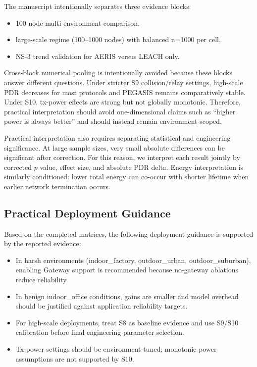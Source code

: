 \documentclass[sensors,article,submit,moreauthors,pdftex]{Definitions/mdpi}
\begin{document}
The manuscript intentionally separates three evidence blocks:
\begin{itemize}
\item 100-node multi-environment comparison,
\item large-scale regime (100--1000 nodes) with balanced n=1000 per cell,
\item NS-3 trend validation for AERIS versus LEACH only.
\end{itemize}
Cross-block numerical pooling is intentionally avoided because these blocks answer different questions. Under stricter S9 collision/relay settings, high-scale PDR decreases for most protocols and PEGASIS remains comparatively stable. Under S10, tx-power effects are strong but not globally monotonic. Therefore, practical interpretation should avoid one-dimensional claims such as ``higher power is always better'' and should instead remain environment-scoped.

Practical interpretation also requires separating statistical and engineering significance. At large sample sizes, very small absolute differences can be significant after correction. For this reason, we interpret each result jointly by corrected $p$ value, effect size, and absolute PDR delta. Energy interpretation is similarly conditioned: lower total energy can co-occur with shorter lifetime when earlier network termination occurs.

\subsection*{Practical Deployment Guidance}
Based on the completed matrices, the following deployment guidance is supported by the reported evidence:
\begin{itemize}
\item In harsh environments (indoor\_factory, outdoor\_urban, outdoor\_suburban), enabling Gateway support is recommended because no-gateway ablations reduce reliability.
\item In benign indoor\_office conditions, gains are smaller and model overhead should be justified against application reliability targets.
\item For high-scale deployments, treat S8 as baseline evidence and use S9/S10 calibration before final engineering parameter selection.
\item Tx-power settings should be environment-tuned; monotonic power assumptions are not supported by S10.
\end{itemize}
\end{document}
